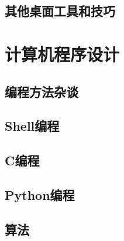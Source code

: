 \documentclass[winfonts]{ctexrep}
\begin{document}
\chapter{其他桌面工具和技巧}


\part{计算机程序设计}
\chapter{编程方法杂谈}

\chapter{Shell编程}

\chapter{C编程}

\chapter{Python编程}

\chapter{算法}



\end{document}
